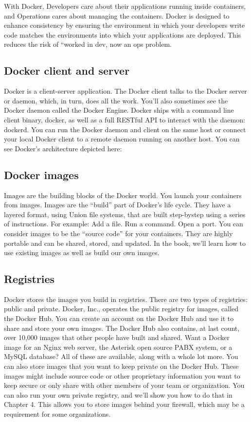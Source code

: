With Docker, Developers care about their applications running inside
containers, and Operations cares about managing the containers. Docker is
designed to enhance consistency by ensuring the environment in which
your developers write code matches the environments into which your
applications are deployed. This reduces the risk of “worked in dev, now an
ops problem.

\subsection{Docker client and server}
Docker is a client-server application. The Docker client talks to the Docker
server or daemon, which, in turn, does all the work. You’ll also sometimes
see the Docker daemon called the Docker Engine. Docker ships with a
command line client binary, docker, as well as a full RESTful API to
interact with the daemon: dockerd. You can run the Docker daemon and
client on the same host or connect your local Docker client to a remote
daemon running on another host. You can see Docker’s architecture
depicted here:
\subsection{Docker images}
Images are the building blocks of the Docker world. You launch your
containers from images. Images are the “build” part of Docker’s life cycle.
They have a layered format, using Union file systems, that are built step-bystep using a series of instructions. For example:
Add a file.
Run a command.
Open a port.
You can consider images to be the “source code” for your containers. They
are highly portable and can be shared, stored, and updated. In the book,
we’ll learn how to use existing images as well as build our own images.
\subsection{Registries}
Docker stores the images you build in registries. There are two types of
registries: public and private. Docker, Inc., operates the public registry for
images, called the Docker Hub. You can create an account on the Docker
Hub and use it to share and store your own images.
The Docker Hub also contains, at last count, over 10,000 images that other
people have built and shared. Want a Docker image for an Nginx web
server, the Asterisk open source PABX system, or a MySQL database? All
of these are available, along with a whole lot more.
You can also store images that you want to keep private on the Docker Hub.
These images might include source code or other proprietary information
you want to keep secure or only share with other members of your team or
organization.
You can also run your own private registry, and we’ll show you how to do
that in Chapter 4. This allows you to store images behind your firewall,
which may be a requirement for some organizations.
